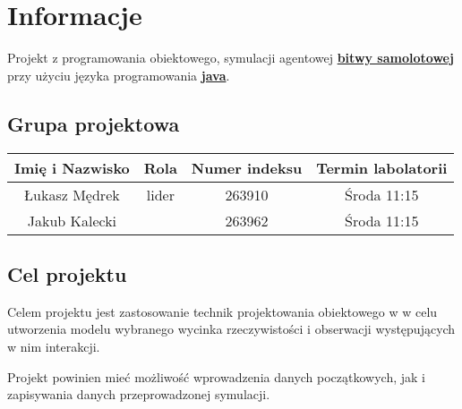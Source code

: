 \documentclass{article}
\begin{document}
\tableofcontents
\newpage

\section{Informacje}

Projekt z programowania obiektowego, symulacji agentowej
\underline{\textbf{bitwy samolotowej}}
przy użyciu języka programowania
\underline{\textbf{java}}.

\subsection{Grupa projektowa}
\begin{center}
	\begin{tabular}{cccc}
		Imię i Nazwisko & Rola & Numer indeksu & Termin labolatorii \\
		\hline Łukasz Mędrek & lider & 263910 & Środa 11:15 \\
		Jakub Kalecki & & 263962 & Środa 11:15 \\
	\end{tabular}
\end{center}

\subsection{Cel projektu}
Celem projektu jest zastosowanie technik projektowania obiektowego w  
w celu utworzenia modelu wybranego wycinka rzeczywistości i obserwacji
występujących w nim interakcji.

Projekt powinien mieć możliwość wprowadzenia danych początkowych, jak 
i zapisywania danych przeprowadzonej symulacji.
\end{document}
